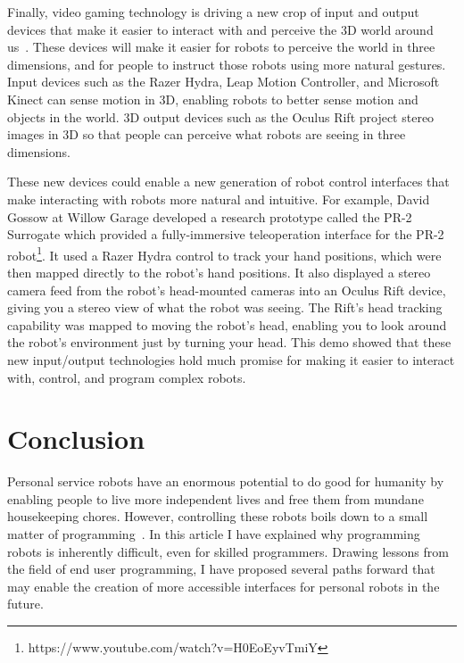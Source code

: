 \documentclass[10pt,twocolumn]{article}
\begin{document}
Finally, video gaming technology is driving a new crop of input and output devices that make it easier to interact with and perceive the 3D world around us~\cite{goth-cacm11}. These devices will make it easier for robots to perceive the world in three dimensions, and for people to instruct those robots using more natural gestures. Input devices such as the Razer Hydra, Leap Motion Controller, and Microsoft Kinect can sense motion in 3D, enabling robots to better sense motion and objects in the world. 3D output devices such as the Oculus Rift project stereo images in 3D so that people can perceive what robots are seeing in three dimensions.

These new devices could enable a new generation of robot control interfaces that make interacting with robots more natural and intuitive. For example, David Gossow at Willow Garage developed a research prototype called the PR-2 Surrogate which provided a fully-immersive teleoperation interface for the PR-2 robot\footnote{https://www.youtube.com/watch?v=H0EoEyvTmiY}. It used a Razer Hydra control to track your hand positions, which were then mapped directly to the robot's hand positions. It also displayed a stereo camera feed from the robot's head-mounted cameras into an Oculus Rift device, giving you a stereo view of what the robot was seeing. The Rift's head tracking capability was mapped to moving the robot's head, enabling you to look around the robot's environment just by turning your head. This demo showed that these new input/output technologies hold much promise for making it easier to interact with, control, and program complex robots.  

\section{Conclusion}

Personal service robots have an enormous potential to do good for humanity by enabling people to live more independent lives and free them from mundane housekeeping chores. However, controlling these robots boils down to a small matter of programming~\cite{nardi-smop}. In this article I have explained why programming robots is inherently difficult, even for skilled programmers.  Drawing lessons from the field of end user programming, I have proposed several paths forward that may enable the creation of more accessible interfaces for personal robots in the future.

\end{document}
